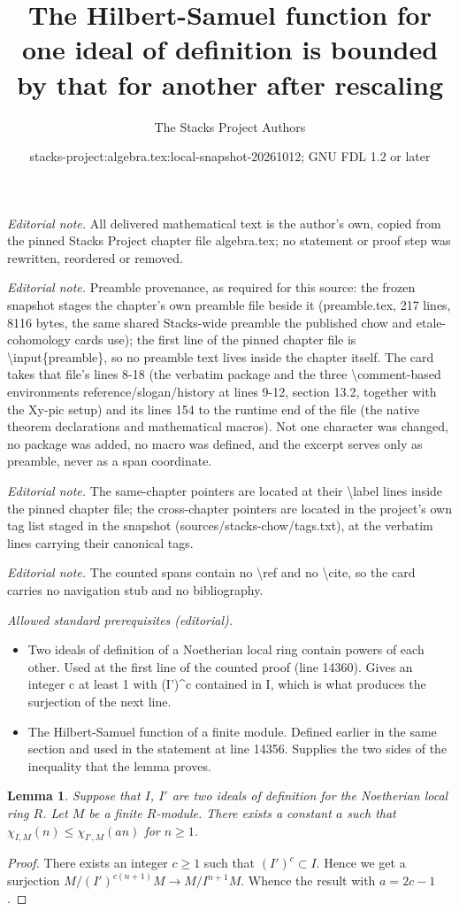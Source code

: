 \documentclass[10pt,a4paper]{amsart}
\title{The Hilbert-Samuel function for one ideal of definition is bounded by that for another after rescaling}
\author{The Stacks Project Authors}
\date{stacks-project:algebra.tex:local-snapshot-20261012; GNU FDL 1.2 or later}
\theoremstyle{plain}
\newtheorem{lemma}[subsection]{Lemma}
\theoremstyle{definition}
\theoremstyle{remark}
\numberwithin{equation}{subsection}
\begin{document}
\maketitle
\noindent\textit{Editorial note.} All delivered mathematical text is the author's own, copied from the pinned Stacks Project chapter file algebra.tex; no statement or proof step was rewritten, reordered or removed.\par\medskip
\noindent\textit{Editorial note.} Preamble provenance, as required for this source: the frozen snapshot stages the chapter's own preamble file beside it (preamble.tex, 217 lines, 8116 bytes, the same shared Stacks-wide preamble the published chow and etale-cohomology cards use); the first line of the pinned chapter file is \textbackslash{}input\{preamble\}, so no preamble text lives inside the chapter itself. The card takes that file's lines 8-18 (the verbatim package and the three \textbackslash{}comment-based environments reference/slogan/history at lines 9-12, section 13.2, together with the Xy-pic setup) and its lines 154 to the runtime end of the file (the native theorem declarations and mathematical macros). Not one character was changed, no package was added, no macro was defined, and the excerpt serves only as preamble, never as a span coordinate.\par\medskip
\noindent\textit{Editorial note.} The same-chapter pointers are located at their \textbackslash{}label lines inside the pinned chapter file; the cross-chapter pointers are located in the project's own tag list staged in the snapshot (sources/stacks-chow/tags.txt), at the verbatim lines carrying their canonical tags.\par\medskip
\noindent\textit{Editorial note.} The counted spans contain no \textbackslash{}ref and no \textbackslash{}cite, so the card carries no navigation stub and no bibliography.\par\medskip
\noindent\textit{Allowed standard prerequisites (editorial).}\begin{itemize}
\item Two ideals of definition of a Noetherian local ring contain powers of each other. Used at the first line of the counted proof (line 14360). Gives an integer c at least 1 with (I')\textasciicircum{}c contained in I, which is what produces the surjection of the next line.
\item The Hilbert-Samuel function of a finite module. Defined earlier in the same section and used in the statement at line 14356. Supplies the two sides of the inequality that the lemma proves.
\end{itemize}\medskip
\begin{lemma}
\label{lemma-hilbert-change-I}
Suppose that $I$, $I'$ are two ideals of definition
for the Noetherian local ring $R$. Let $M$ be a
finite $R$-module. There exists a constant $a$ such that
$\chi_{I, M}(n) \leq \chi_{I', M}(an)$ for $n \geq 1$.
\end{lemma}

\begin{proof}
There exists an integer $c \geq 1$ such that $(I')^c \subset I$.
Hence we get a surjection $M/(I')^{c(n + 1)}M \to M/I^{n + 1}M$.
Whence the result with $a = 2c - 1$.
\end{proof}
\end{document}
